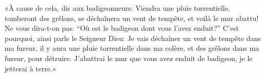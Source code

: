 «À cause de cela, dis aux badigeonneurs:
	Viendra une pluie torrentielle, tomberont des grêlons,
	se déchaînera un vent de tempête, et voilà le mur abattu!
Ne vous dira-t-on pas:
	“Où est le badigeon dont vous l’avez enduit?”
C’est pourquoi, ainsi parle le Seigneur Dieu:
	Je vais déchaîner un vent de tempête dans ma fureur,
	il y aura une pluie torrentielle dans ma colère,
	et des grêlons dans ma fureur, pour détruire.
J’abattrai le mur que vous avez enduit de badigeon, je le jetterai à terre.»
